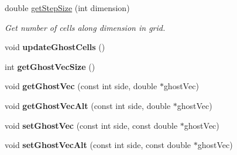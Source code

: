 \begin{DoxyCompactItemize}
double \hyperlink{class_grid_a7c37daac383190622c7cf37597101510}{get\+Step\+Size} (int dimension)
\begin{DoxyCompactList}\small\item\em Get number of cells along dimension in grid. \end{DoxyCompactList}\item 
\hypertarget{class_grid_ae677a62490f6c432895e2ac38e9c0ef8}{}\label{class_grid_ae677a62490f6c432895e2ac38e9c0ef8} 
void {\bfseries update\+Ghost\+Cells} ()
\item 
\hypertarget{class_grid_a3ec170bd98cf658e567ac0d6a4975ceb}{}\label{class_grid_a3ec170bd98cf658e567ac0d6a4975ceb} 
int {\bfseries get\+Ghost\+Vec\+Size} ()
\item 
\hypertarget{class_grid_a768ae91746ecfc1d7b9172c431ecf45c}{}\label{class_grid_a768ae91746ecfc1d7b9172c431ecf45c} 
void {\bfseries get\+Ghost\+Vec} (const int side, double $\ast$ghost\+Vec)
\item 
\hypertarget{class_grid_a606fe5333db63f24d270a0546608f1f4}{}\label{class_grid_a606fe5333db63f24d270a0546608f1f4} 
void {\bfseries get\+Ghost\+Vec\+Alt} (const int side, double $\ast$ghost\+Vec)
\item 
\hypertarget{class_grid_aa24065a7d9fedd06cdb78a4c81c44b79}{}\label{class_grid_aa24065a7d9fedd06cdb78a4c81c44b79} 
void {\bfseries set\+Ghost\+Vec} (const int side, const double $\ast$ghost\+Vec)
\item 
\hypertarget{class_grid_a5d47f8db0c280c26467b5a91465b7d40}{}\label{class_grid_a5d47f8db0c280c26467b5a91465b7d40} 
void {\bfseries set\+Ghost\+Vec\+Alt} (const int side, const double $\ast$ghost\+Vec)
\end{DoxyCompactItemize}
